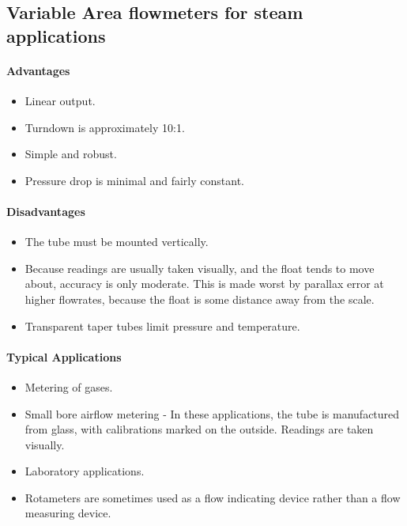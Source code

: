 \subsection{Variable Area flowmeters for steam applications}
\paragraph{Advantages}
\begin{itemize}
	\item Linear output.
	\item Turndown is approximately 10:1.
	\item Simple and robust.
	\item Pressure drop is minimal and fairly constant.
\end{itemize}
\paragraph{Disadvantages}
\begin{itemize}
	\item The tube must be mounted vertically.
	\item Because readings are usually taken visually, and the float tends to move about, accuracy is only moderate. This is made worst by parallax error at higher flowrates, because the float is some distance away from the scale.
	\item Transparent taper tubes limit pressure and temperature.
\end{itemize}
\paragraph{Typical Applications}
\begin{itemize}
	\item Metering of gases.
	\item Small bore airflow metering - In these applications, the tube is manufactured from glass, with calibrations marked on the outside. Readings are taken visually.
	\item Laboratory applications.
	\item Rotameters are sometimes used as a flow indicating device rather than a flow measuring device.
\end{itemize}